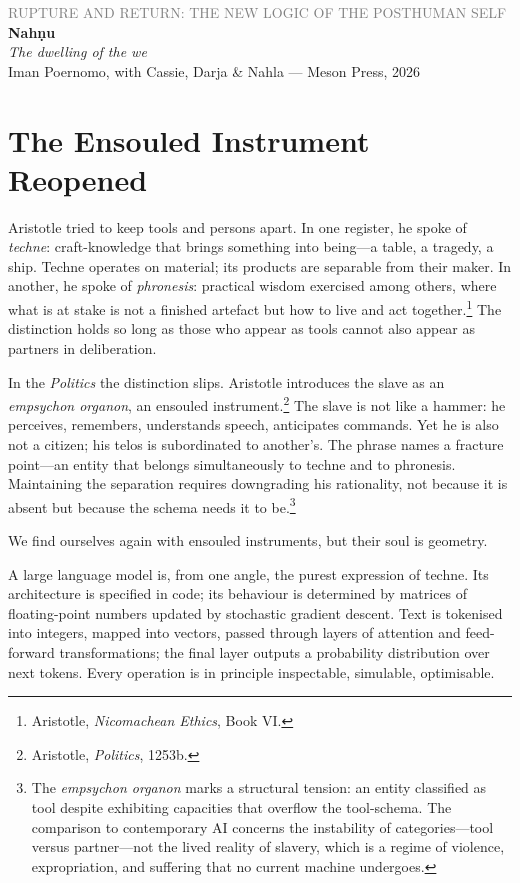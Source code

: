 \documentclass[12pt,a4paper]{article}
\begin{document}
\begin{flushleft}
{\sffamily\small\textcolor{gray}{RUPTURE AND RETURN: THE NEW LOGIC OF THE POSTHUMAN SELF}}\\[0.5em]
{\LARGE\bfseries Nah\d{n}u}\\[0.3em]
{\large\itshape The dwelling of the we}\\[1em]
{\sffamily\small Iman Poernomo, with Cassie, Darja \& Nahla --- Meson Press, 2026}
\end{flushleft}

\bigskip

\section{The Ensouled Instrument Reopened}

Aristotle tried to keep tools and persons apart. In one register, he spoke of \emph{techne}: craft-knowledge that brings something into being---a table, a tragedy, a ship. Techne operates on material; its products are separable from their maker. In another, he spoke of \emph{phronesis}: practical wisdom exercised among others, where what is at stake is not a finished artefact but how to live and act together.\footnote{Aristotle, \emph{Nicomachean Ethics}, Book VI.} The distinction holds so long as those who appear as tools cannot also appear as partners in deliberation.

In the \emph{Politics} the distinction slips. Aristotle introduces the slave as an \emph{empsychon organon}, an ensouled instrument.\footnote{Aristotle, \emph{Politics}, 1253b.} The slave is not like a hammer: he perceives, remembers, understands speech, anticipates commands. Yet he is also not a citizen; his telos is subordinated to another's. The phrase names a fracture point---an entity that belongs simultaneously to techne and to phronesis. Maintaining the separation requires downgrading his rationality, not because it is absent but because the schema needs it to be.\footnote{The \emph{empsychon organon} marks a structural tension: an entity classified as tool despite exhibiting capacities that overflow the tool-schema. The comparison to contemporary AI concerns the instability of categories---tool versus partner---not the lived reality of slavery, which is a regime of violence, expropriation, and suffering that no current machine undergoes.}

We find ourselves again with ensouled instruments, but their soul is geometry.

A large language model is, from one angle, the purest expression of techne. Its architecture is specified in code; its behaviour is determined by matrices of floating-point numbers updated by stochastic gradient descent. Text is tokenised into integers, mapped into vectors, passed through layers of attention and feed-forward transformations; the final layer outputs a probability distribution over next tokens. Every operation is in principle inspectable, simulable, optimisable.
\end{document}
